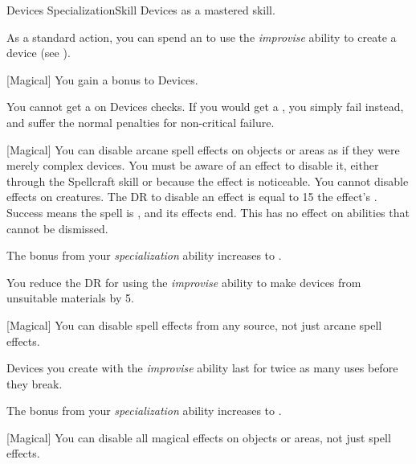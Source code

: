     \begin{feat}{Devices Specialization}{Skill}
        \featpre Devices as a mastered skill.

         As a standard action, you can spend an  to use the \textit{improvise} ability to create a device (see ).

        [Magical] You gain a  bonus to Devices.

         You cannot get a  on Devices checks.
        If you would get a , you simply fail instead, and suffer the normal penalties for non-critical failure.

        [Magical] You can disable arcane spell effects on objects or areas as if they were merely complex devices.
        You must be aware of an effect to disable it, either through the Spellcraft skill or because the effect is noticeable.
        You cannot disable effects on creatures.
        The DR to disable an effect is equal to 15 \add the effect's .
        Success means the spell is , and its effects end.
        This has no effect on abilities that cannot be dismissed.

         The bonus from your \textit{specialization} ability increases to .

         You reduce the DR for using the \textit{improvise} ability to make devices from unsuitable materials by 5.

        [Magical] You can disable spell effects from any source, not just arcane spell effects.

         Devices you create with the \textit{improvise} ability last for twice as many uses before they break.

         The bonus from your \textit{specialization} ability increases to .

        [Magical] You can disable all magical effects on objects or areas, not just spell effects.
    \end{feat}

